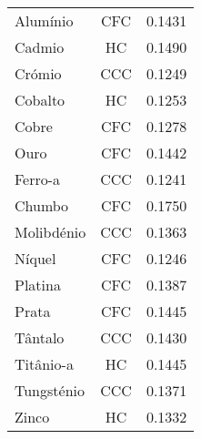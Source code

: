 \documentclass[\mainfilename]{subfiles}
\begin{document}
\begin{questionBox}
\begin{questionBox}
\begin{center}
\begin{tabular}{l c C}
                \\\midrule
                
                  Alumínio   & CFC  & 0.1431
                \\Cadmio     & HC   & 0.1490
                \\Crómio     & CCC  & 0.1249
                \\Cobalto    & HC   & 0.1253
                \\Cobre      & CFC  & 0.1278
                \\Ouro       & CFC  & 0.1442
                \\Ferro-a    & CCC  & 0.1241
                \\Chumbo     & CFC  & 0.1750
                \\Molibdénio & CCC  & 0.1363
                \\Níquel     & CFC  & 0.1246
                \\Platina    & CFC  & 0.1387
                \\Prata      & CFC  & 0.1445
                \\Tântalo    & CCC  & 0.1430
                \\Titânio-a  & HC   & 0.1445
                \\Tungsténio & CCC  & 0.1371
                \\Zinco      & HC   & 0.1332
                
                \\\bottomrule
            \end{tabular}
            \vspace{2ex}
        \end{center}
    \end{questionBox}
\end{questionBox}
\end{document}
